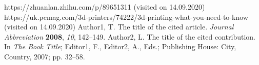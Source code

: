\documentclass[journal,article,submit,moreauthors,pdftex]{Definitions/mdpi}
\begin{document}

\begin{thebibliography}{999}
https://zhuanlan.zhihu.com/p/89651311 (visited on 14.09.2020)
https://uk.pcmag.com/3d-printers/74222/3d-printing-what-you-need-to-know (visited on 14.09.2020)
Author1, T. The title of the cited article. {\em Journal Abbreviation} {\bf 2008}, {\em 10}, 142--149.
Author2, L. The title of the cited contribution. In {\em The Book Title}; Editor1, F., Editor2, A., Eds.; Publishing House: City, Country, 2007; pp. 32--58.
\end{thebibliography}


%



\end{document}
